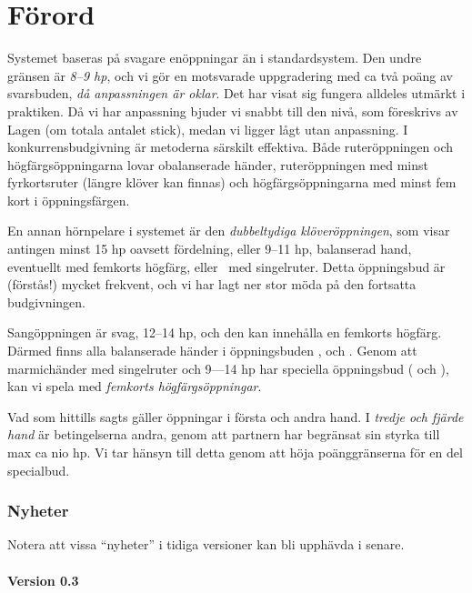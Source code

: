 \chapter*{F\"orord}


Systemet  baseras på svagare
en\-öpp\-ning\-ar än i standardsystem. Den undre gränsen är {\em 8--9
hp}, och vi gör en motsvarade uppgradering med ca två poäng av
svarsbuden, {\em då anpassningen är oklar}. Det har visat sig fungera
alldeles utmärkt i praktiken. Då vi har anpassning bjuder vi snabbt till
den nivå, som föreskrivs av {\sc Lagen} (om totala antalet stick), medan
vi ligger lågt utan anpassning. I konkurrensbudgivning är metoderna särskilt
effektiva. Både ruteröppningen och högfärgsöppningarna lovar obalanserade
händer, ruteröppningen med minst fyrkortsruter (längre klöver kan finnas)
och högfärgsöppningarna med minst fem kort i öppningsfärgen.

En annan hörnpelare i systemet är den {\em dubbeltydiga klöveröppningen},
som visar antingen minst 15 hp oavsett fördelning, eller 9--11 hp,
balanserad hand, eventuellt med femkorts högfärg, eller \marmic\ med
singelruter. Detta öppningsbud är (förstås!) 
mycket frekvent, och vi har lagt ner stor möda på den fortsatta
budgivningen.

Sangöppningen är svag, 12--14 hp, och den kan innehålla en femkorts
högfärg. Därmed finns alla balanserade händer i 
öppningsbuden ,  och .
Genom att marmichänder med singelruter och 9---14 hp har speciella
öppningsbud ( och ), kan vi spela med {\em
femkorts högfärgsöppningar}.

Vad som hittills sagts gäller öppningar i första och andra hand. I {\em tredje
och fjärde hand} är betingelserna andra, genom att partnern har
begränsat sin styrka till max ca nio hp. Vi tar hänsyn till detta genom att
höja poänggränserna för en del specialbud.

\subsection{Nyheter}

Notera att vissa ``nyheter'' i tidiga versioner kan bli upphävda i senare.
\subsubsection*{Version 0.3}

